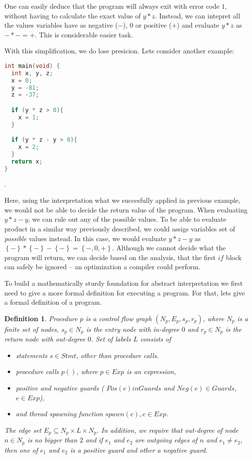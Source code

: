 \documentclass[..thesis.tex]{subfiles}
\newtheorem{defin}{Definition}[section]
\begin{document}
One can easily deduce that the program will always exit with error code $1$, without having to calculate the exact value of  $y*z$.
Instead, we can intepret all the values variables have as negative ($-$), $0$ or positive ($+$) and evaluate $y * z$ as $-*- = +$.
This is considerable easier task.

With this simplification, we do lose presicion. Lets consider another example:

\begin{lstlisting}[language=C,style=def]
int main(void) {
  int x, y, z;
  x = 0;
  y = -81;
  z = -37;

  if (y * z > 0){
    x = 1;
  }

  if (y * z - y > 0){
    x = 2;
  }
  return x;
}
\end{lstlisting}.


Here, using the interpretation what we succesfully applied in previous example, we would not be able to decide the return value of the program. 
When evaluating $y * z - y $, we can rule out any of the possible values. To be able to evaluate product in a similar way previously described,
we could assigs variables set of \textit{possible} values instead. In this case, we would evaluate $y * z - y $ as $\left\lbrace - \right\rbrace * \left\lbrace
- \right\rbrace - \left\lbrace - \right\rbrace = \left\lbrace -,0,+ \right\rbrace$. Although we cannot decide what the program will return,
we can decide based on the analysis, that the first $if$ block can safely be ignored -- an optimization a compiler could perform.

To build a mathematically sturdy foundation for abstract interpretation we first need to give a more formal definition for executing a program.
 For that, lets give a formal definition of a program.

\begin{defin}
Procedure $p$ is a \textit{control flow graph} $\left( N_p,E_p,s_p,r_p \right)$, where $N_p$ is a finite set of nodes, $s_p \in N_p$
 is the \textit{entry} node with in-degree $0$ and  $r_p \in N_p$ is the \textit{return} node with out-degree $0$. Set of labels $L$ consists of
\begin{itemize}
\item statements $s \in Stmt$, other than procedure calls.
\item procedure calls $p()$, where $p \in Exp$ is an expression, 
\item positive and negative guards ( $Pos\left( e \right) in Guards$ and  $Neg \left( e \right) \in Guards$, $e \in Exp$),
\item and thread spawning function $spawn\left( e \right), e \in Exp$.  
\end{itemize}
The edge set  $E_p \subseteq N_p \times L \times N_p$. In addition, we require that out-degree of node $n \in N_p$ is no bigger than $2$ 
and if $e_1$ and $e_2$ are outgoing edges of $n$ and $e_1 \neq e_2$, then one of $e_1$ and $e_2$ is a positive guard and other a negative guard. 
\end{defin}
\end{document}

